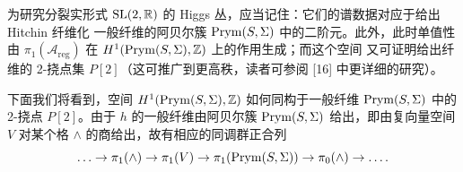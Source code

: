 
为研究分裂实形式 $\mathrm{SL}(2,\mathbb{R})$ 的 Higgs 丛，应当记住：它们的谱数据对应于给出 Hitchin 纤维化
一般纤维的阿贝尔簇 $\operatorname{Prym}(S,\Sigma)$ 中的二阶元。此外，此时单值性由
$\pi_1(\mathcal{A}_{\mathrm{reg}})$ 在 $H^1(\operatorname{Prym}(S,\Sigma),\mathbb{Z})$ 上的作用生成；而这个空间
又可证明给出纤维的 2-挠点集 $P[2]$（这可推广到更高秩，读者可参阅 [16] 中更详细的研究）。

下面我们将看到，空间 $H^1(\operatorname{Prym}(S,\Sigma),\mathbb{Z})$ 如何同构于一般纤维 $\operatorname{Prym}(S,\Sigma)$ 中的
2-挠点 $P[2]$。由于 $h$ 的一般纤维由阿贝尔簇 $\operatorname{Prym}(S,\Sigma)$ 给出，即由复向量空间 $V$
对某个格 $\wedge$ 的商给出，故有相应的同调群正合列
\[
\ldots\to\pi_1(\wedge)\to\pi_1(V)\to\pi_1(\operatorname{Prym}(S,\Sigma))\to\pi_0(\wedge)\to\ldots.
\]
